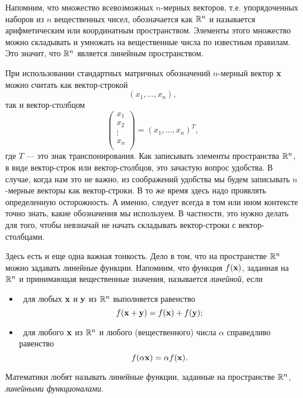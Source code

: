     Напомним, что множество всевозможных $n$-мерных векторов, т.е.
    упорядоченных наборов из $n$ вещественных чисел, обозначается как
    $\mathbb{R}^{n}$ и называется арифметическим или координатным пространством.
    Элементы этого множество можно складывать и умножать на
    вещественные числа по известным правилам. Это значит, что $\mathbb{R}^{n}$
    является линейным пространством.

    При использовании стандартных
    матричных обозначений $n$-мерный вектор $\mathbf{x}$ можно считать как
    вектор-строкой
    \[(x_{1},\ldots,x_{n}),\]
    так и вектор-столбцом
    \[\left(
     \begin{array}{c}
        x_{1} \\
        x_{2} \\
        \vdots \\
        x_{n}  \\
      \end{array}
    \right)=(x_{1},\ldots,x_{n})^{T},\]
    где $T$ --- это знак транспонирования.
        Как записывать элементы пространства $\mathbb{R}^{n}$, в виде
    вектор-строк или вектор-столбцов, это зачастую вопрос
    удобства. В случае, когда нам это не важно, из
    соображений удобства мы будем записывать $n$-мерные векторы как
    вектор-строки.
     В то же время здесь надо проявлять определенную
    осторожность. А именно, следует всегда в том или ином контексте
    точно знать, какие обозначения мы используем. В частности, это
    нужно делать для того, чтобы невзначай не начать складывать
    вектор-строки с вектор-столбцами.

    Здесь есть и еще одна важная тонкость. Дело в том, что на
    пространстве $\mathbb{R}^{n}$ можно задавать линейные функции. Напомним,
    что функция $f(\mathbf{x})$, заданная на $\mathbb{R}^{n}$ и принимающая
    вещественные значения, называется \emph{линейной}, если
\begin{itemize}
    \item [1)\ ] \ для любых $\mathbf{x}$ и $\mathbf{y}$ из $\mathbb{R}^{n}$
    выполняется равенство
    \[f(\mathbf{x}+\mathbf{y})=f(\mathbf{x})+f(\mathbf{y});\]
    \item [2)\ ] \ для любого $\mathbf{x}$ из $\mathbb{R}^{n}$ и любого
    (вещественного) числа $\alpha$ справедливо равенство
    \[f(\alpha\mathbf{x})=\alpha f(\mathbf{x}).\]
\end{itemize}
    Математики любят называть линейные функции, заданные на
    пространстве $\mathbb{R}^{n}$, \emph{линейными функционалами}.

